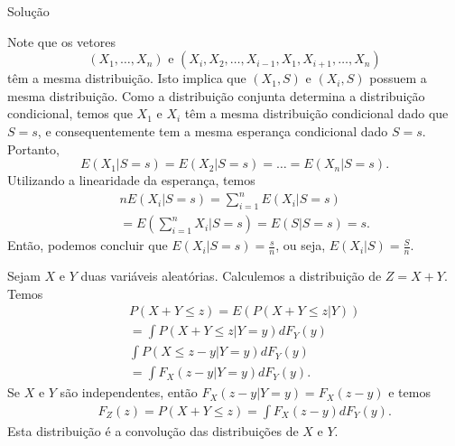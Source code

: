 \begin{frame}
\begin{block}{Solução}


Note que os vetores $$(X_1,\ldots,X_n)\mbox{ e }(X_i,X_2,\ldots,X_{i-1},X_1,X_{i+1},\ldots,X_n)$$ têm a mesma distribuição. Isto implica que $(X_1,S)$ e $(X_i,S)$ possuem a mesma distribuição. Como a distribuição conjunta determina a distribuição condicional, temos que $X_1$ e $X_i$ têm a mesma distribuição condicional dado que $S=s$, e consequentemente tem a mesma esperança condicional dado $S=s$. Portanto,
$$E(X_1|S=s)=E(X_2|S=s)=\ldots=E(X_n|S=s).$$
Utilizando a linearidade da esperança, temos
\begin{eqnarray}
& & nE(X_i|S=s)=\sum_{i=1}^{n}E(X_i|S=s) \nonumber \\
& & =E(\sum_{i=1}^{n}X_i|S=s)=E(S|S=s)=s. \nonumber
\end{eqnarray}
Então, podemos concluir que $E(X_i|S=s)=\frac{s}{n}$, ou seja, $E(X_i|S)=\frac{S}{n}$.


\end{block}
\end{frame}

\begin{frame}
\begin{exem}
Sejam $X$ e $Y$ duas variáveis aleatórias. Calculemos a distribuição
de $Z=X+Y$. Temos
\begin{eqnarray}
& & P(X+Y\leq z)=E(P(X+Y\leq z|Y))\nonumber\\
& & =\int P(X+Y\leq z|Y=y)dF_Y(y)
\nonumber \\
& & \int P(X\leq z-y|Y=y)dF_Y(y)\nonumber\\
& & =\int F_X(z-y|Y=y)dF_Y(y). \nonumber
\end{eqnarray}
Se $X$ e $Y$ são independentes, então $F_X(z-y|Y=y)=F_X(z-y)$ e
temos
\begin{eqnarray}
& & F_Z(z)=P(X+Y\leq z)=\int F_X(z-y)dF_Y(y).\nonumber
\end{eqnarray}
Esta distribuição é a convolução das distribuições de $X$ e $Y$.
\end{exem}
\end{frame}






